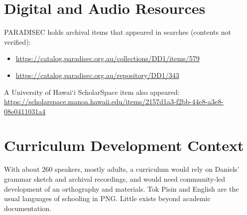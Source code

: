 \documentclass[12pt]{article}
\begin{document}
\section{Digital and Audio Resources}
PARADISEC holds archival items that appeared in searches (contents not verified):
\begin{itemize}
\item \url{https://catalog.paradisec.org.au/collections/DD1/items/579}
\item \url{https://catalog.paradisec.org.au/repository/DD1/343}
\end{itemize}
A University of Hawai`i ScholarSpace item also appeared: \url{https://scholarspace.manoa.hawaii.edu/items/2157d1a3-f2bb-44e8-a3e8-08e0411031a4}

\section{Curriculum Development Context}
With about 260 speakers, mostly adults, a curriculum would rely on Daniels' grammar sketch and archival recordings, and would need community-led development of an orthography and materials. Tok Pisin and English are the usual languages of schooling in PNG. Little exists beyond academic documentation.
\end{document}
